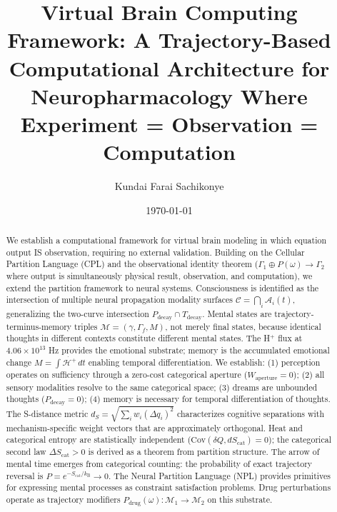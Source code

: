\documentclass[aps,prd,twocolumn,superscriptaddress,floatfix,nofootinbib]{revtex4-2}
\theoremstyle{remark}
\newcommand{\Ccat}{\mathcal{C}}
\newcommand{\Pop}{P}
\newcommand{\Gstate}{\Gamma}
\newcommand{\kB}{k_{\mathrm{B}}}
\newcommand{\Hfield}{\mathcal{H}^+}
\newcommand{\Pdecay}{P_{\mathrm{decay}}}
\newcommand{\Tdecay}{T_{\mathrm{decay}}}
\newcommand{\Mstate}{\mathcal{M}}
\newcommand{\Scatent}{S_{\mathrm{cat}}}
\begin{document}
\title{Virtual Brain Computing Framework: A Trajectory-Based Computational Architecture for Neuropharmacology Where Experiment = Observation = Computation}

\author{Kundai Farai Sachikonye}

\date{\today}

\begin{abstract}
We establish a computational framework for virtual brain modeling in which equation output IS observation, requiring no external validation. Building on the Cellular Partition Language (CPL) and the observational identity theorem ($\Gstate_1 \oplus \Pop(\omega) \to \Gstate_2$ where output is simultaneously physical result, observation, and computation), we extend the partition framework to neural systems. Consciousness is identified as the intersection of multiple neural propagation modality surfaces $\Ccat = \bigcap_i \mathcal{A}_i(t)$, generalizing the two-curve intersection $\Pdecay \cap \Tdecay$. Mental states are trajectory-terminus-memory triples $\Mstate = (\gamma, \Gstate_f, M)$, not merely final states, because identical thoughts in different contexts constitute different mental states. The H$^+$ flux at $4.06 \times 10^{13}$ Hz provides the emotional substrate; memory is the accumulated emotional change $M = \int \dot{\Hfield} \, dt$ enabling temporal differentiation. We establish: (1) perception operates on sufficiency through a zero-cost categorical aperture ($W_{\text{aperture}} = 0$); (2) all sensory modalities resolve to the same categorical space; (3) dreams are unbounded thoughts ($\Pdecay = 0$); (4) memory is necessary for temporal differentiation of thoughts. The S-distance metric $d_S = \sqrt{\sum_i w_i (\Delta q_i)^2}$ characterizes cognitive separations with mechanism-specific weight vectors that are approximately orthogonal. Heat and categorical entropy are statistically independent ($\text{Cov}(\delta Q, d\Scatent) = 0$); the categorical second law $\Delta \Scatent > 0$ is derived as a theorem from partition structure. The arrow of mental time emerges from categorical counting: the probability of exact trajectory reversal is $P = e^{-\Scatent/\kB} \to 0$. The Neural Partition Language (NPL) provides primitives for expressing mental processes as constraint satisfaction problems. Drug perturbations operate as trajectory modifiers $\Pop_{\mathrm{drug}}(\omega): \Mstate_1 \to \Mstate_2$ on this substrate.
\end{abstract}
\end{document}
